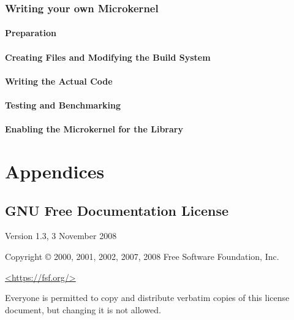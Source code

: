 \documentclass{scrbook}
\begin{document}
\section{Writing your own Microkernel}

\subsection{Preparation}

\subsection{Creating Files and Modifying the Build System}

\subsection{Writing the Actual Code}

\subsection{Testing and Benchmarking}

\subsection{Enabling the Microkernel for the Library}


\appendix
\part*{Appendices}

\chapter{GNU Free Documentation License}
\label{chp:gnufdl}

 \begin{center}

       Version 1.3, 3 November 2008


 Copyright \copyright{} 2000, 2001, 2002, 2007, 2008  Free Software Foundation, Inc.
 
 \bigskip
 
     \url{<https://fsf.org/>}
  
 \bigskip
 
 Everyone is permitted to copy and distribute verbatim copies
 of this license document, but changing it is not allowed.
\end{center}
\end{document}
